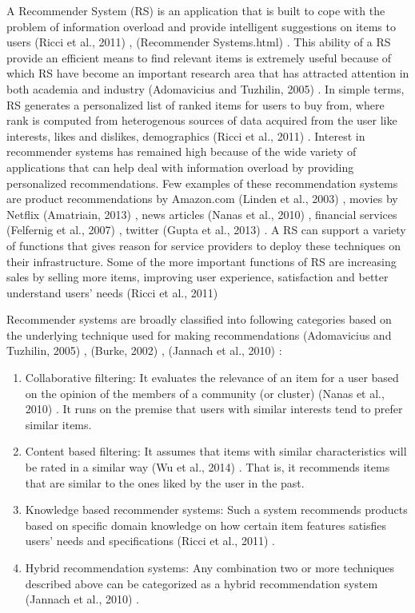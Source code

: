 \documentclass[12pt]{article}
\begin{document}
A Recommender System (RS) is an application that is built to cope with the problem of information overload and provide intelligent suggestions on items to users (Ricci et al., 2011) \cite{ricci}, (Recommender Systems.html) \cite{recommender systems.html}. This ability of a RS provide an efficient means to find relevant items is extremely useful because of which RS have become an important research area that has attracted attention in both academia and industry (Adomavicius and Tuzhilin, 2005) \cite{adomavicius}. In simple terms, RS generates a personalized list of ranked items for users to buy from, where rank is computed from heterogenous sources of data acquired from the user like interests, likes and dislikes, demographics (Ricci et al., 2011) \cite{ricci}. Interest in recommender systems has remained high because of the wide variety of applications that can help deal with information overload by providing personalized recommendations. Few examples of these recommendation systems are product recommendations by Amazon.com (Linden et al., 2003) \cite{linden}, movies by Netflix (Amatriain, 2013) \cite{amatriain}, news articles (Nanas et al., 2010) \cite{nanas}, financial services (Felfernig et al., 2007) \cite{felfernig}, twitter (Gupta et al., 2013) \cite{gupta}. A RS can support a variety of functions that gives reason for service providers to deploy these techniques on their infrastructure. Some of the more important functions of RS are increasing sales by selling more items, improving user experience, satisfaction and better understand users' needs (Ricci et al., 2011) \cite{ricci}

Recommender systems are broadly classified into following categories based on the underlying technique used for making recommendations (Adomavicius and Tuzhilin, 2005) \cite{adomavicius}, (Burke, 2002) \cite{burke}, (Jannach et al., 2010) \cite{jannach}:

\begin{enumerate}
\item Collaborative filtering: It evaluates the relevance of an item for a user based on the opinion of the members of a community (or cluster) (Nanas et al., 2010) \cite{nanas}. It runs on the premise that users with similar interests tend to prefer similar items.
\item Content based filtering: It assumes that items with similar characteristics will be rated in a similar way (Wu et al., 2014) \cite{wu}. That is, it recommends items that are similar to the ones liked by the user in the past.
\item Knowledge based recommender systems: Such a system recommends products based on specific domain knowledge on how certain item features satisfies users' needs and specifications (Ricci et al., 2011) \cite{ricci}. 
\item Hybrid recommendation systems: Any combination two or more techniques described above can be categorized as a hybrid recommendation system (Jannach et al., 2010) \cite{jannach}.
\end{enumerate}
\end{document}
